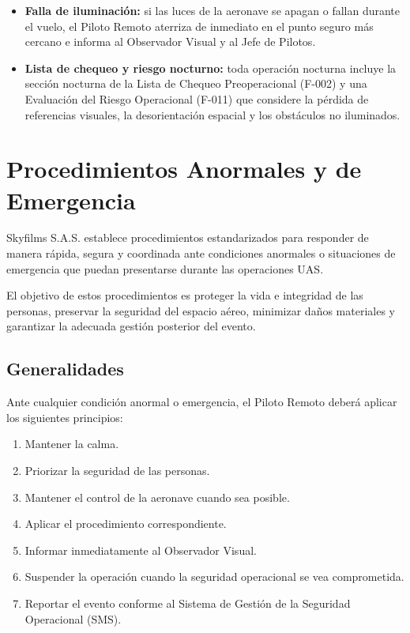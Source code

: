 \begin{itemize}
    \item \textbf{Falla de iluminación:} si las luces de la aeronave se apagan o fallan durante el vuelo, el Piloto Remoto aterriza de inmediato en el punto seguro más cercano e informa al Observador Visual y al Jefe de Pilotos.
    \item \textbf{Lista de chequeo y riesgo nocturno:} toda operación nocturna incluye la sección nocturna de la Lista de Chequeo Preoperacional (F-002) y una Evaluación del Riesgo Operacional (F-011) que considere la pérdida de referencias visuales, la desorientación espacial y los obstáculos no iluminados.
\end{itemize}

\section{Procedimientos Anormales y de Emergencia}

Skyfilms S.A.S. establece procedimientos estandarizados para responder de manera rápida, segura y coordinada ante condiciones anormales o situaciones de emergencia que puedan presentarse durante las operaciones UAS.

El objetivo de estos procedimientos es proteger la vida e integridad de las personas, preservar la seguridad del espacio aéreo, minimizar daños materiales y garantizar la adecuada gestión posterior del evento.


\subsection{Generalidades}

Ante cualquier condición anormal o emergencia, el Piloto Remoto deberá aplicar los siguientes principios:

\begin{enumerate}

\item Mantener la calma.

\item Priorizar la seguridad de las personas.

\item Mantener el control de la aeronave cuando sea posible.

\item Aplicar el procedimiento correspondiente.

\item Informar inmediatamente al Observador Visual.

\item Suspender la operación cuando la seguridad operacional se vea comprometida.

\item Reportar el evento conforme al Sistema de Gestión de la Seguridad Operacional (SMS).

\end{enumerate}

